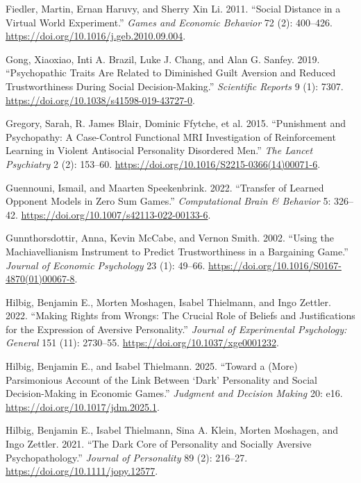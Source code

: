 \documentclass[
]{article}
\newlength{\cslhangindent}
\newenvironment{CSLReferences}[2] %
 {\begin{list}{}{%
  \setlength{\itemindent}{0pt}
  \setlength{\leftmargin}{0pt}
  \setlength{\parsep}{0pt}
  \ifodd #1
   \setlength{\leftmargin}{\cslhangindent}
   \setlength{\itemindent}{-1\cslhangindent}
  \fi
  \setlength{\itemsep}{#2\baselineskip}}}
 {\end{list}}
\begin{document}
\begin{CSLReferences}{1}{1}
Fiedler, Martin, Ernan Haruvy, and Sherry Xin Li. 2011. {``Social Distance in a Virtual World Experiment.''} \emph{Games and Economic Behavior} 72 (2): 400--426. \url{https://doi.org/10.1016/j.geb.2010.09.004}.

Gong, Xiaoxiao, Inti A. Brazil, Luke J. Chang, and Alan G. Sanfey. 2019. {``Psychopathic Traits Are Related to Diminished Guilt Aversion and Reduced Trustworthiness During Social Decision-Making.''} \emph{Scientific Reports} 9 (1): 7307. \url{https://doi.org/10.1038/s41598-019-43727-0}.

Gregory, Sarah, R. James Blair, Dominic Ffytche, et al. 2015. {``Punishment and Psychopathy: A Case-Control Functional {MRI} Investigation of Reinforcement Learning in Violent Antisocial Personality Disordered Men.''} \emph{The Lancet Psychiatry} 2 (2): 153--60. \url{https://doi.org/10.1016/S2215-0366(14)00071-6}.

Guennouni, Ismail, and Maarten Speekenbrink. 2022. {``Transfer of Learned Opponent Models in Zero Sum Games.''} \emph{Computational Brain \& Behavior} 5: 326--42. \url{https://doi.org/10.1007/s42113-022-00133-6}.

Gunnthorsdottir, Anna, Kevin McCabe, and Vernon Smith. 2002. {``Using the {Machiavellianism} Instrument to Predict Trustworthiness in a Bargaining Game.''} \emph{Journal of Economic Psychology} 23 (1): 49--66. \url{https://doi.org/10.1016/S0167-4870(01)00067-8}.

Hilbig, Benjamin E., Morten Moshagen, Isabel Thielmann, and Ingo Zettler. 2022. {``Making Rights from Wrongs: The Crucial Role of Beliefs and Justifications for the Expression of Aversive Personality.''} \emph{Journal of Experimental Psychology: General} 151 (11): 2730--55. \url{https://doi.org/10.1037/xge0001232}.

Hilbig, Benjamin E., and Isabel Thielmann. 2025. {``Toward a (More) Parsimonious Account of the Link Between {`Dark'} Personality and Social Decision-Making in Economic Games.''} \emph{Judgment and Decision Making} 20: e16. \url{https://doi.org/10.1017/jdm.2025.1}.

Hilbig, Benjamin E., Isabel Thielmann, Sina A. Klein, Morten Moshagen, and Ingo Zettler. 2021. {``The Dark Core of Personality and Socially Aversive Psychopathology.''} \emph{Journal of Personality} 89 (2): 216--27. \url{https://doi.org/10.1111/jopy.12577}.


\end{CSLReferences}
\end{document}
